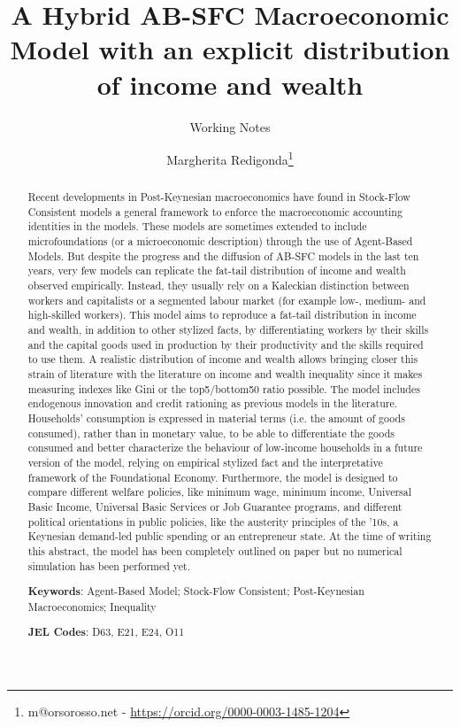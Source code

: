 \documentclass[a4paper, headings=standardclasses]{scrartcl}
\title{A Hybrid AB-SFC Macroeconomic Model with an explicit distribution of income and wealth \let\thefootnote\relax\footnotetext{
	This version is intended to be submitted as a working paper to the 2023 STOREP Conference.

	An updated version of this paper and all the source code and the instructions required to replicate the paper will be available at \url{https://github.com/TnTo/FE/}
  }}
\subtitle{Working Notes}
\author{Margherita Redigonda\thanks{m@orsorosso.net - \url{https://orcid.org/0000-0003-1485-1204}}}
\begin{document}
\maketitle

\begin{abstract}
    Recent developments in Post-Keynesian macroeconomics have found in Stock-Flow Consistent models a general framework to enforce the macroeconomic accounting identities in the models.
    These models are sometimes extended to include microfoundations (or a microeconomic description) through the use of Agent-Based Models.
    But despite the progress and the diffusion of AB-SFC models in the last ten years, very few models can replicate the fat-tail distribution of income and wealth observed empirically.
    Instead, they usually rely on a Kaleckian distinction between workers and capitalists or a segmented labour market (for example low-, medium- and high-skilled workers).
    This model aims to reproduce a fat-tail distribution in income and wealth, in addition to other stylized facts, by differentiating workers by their skills and the capital goods used in production by their productivity and the skills required to use them.
    A realistic distribution of income and wealth allows bringing closer this strain of literature with the literature on income and wealth inequality since it makes measuring indexes like Gini or the top5/bottom50 ratio possible.
    The model includes endogenous innovation and credit rationing as previous models in the literature.
    Households' consumption is expressed in material terms (i.e. the amount of goods consumed), rather than in monetary value, to be able to differentiate the goods consumed and better characterize the behaviour of low-income households in a future version of the model, relying on empirical stylized fact and the interpretative framework of the Foundational Economy.
    Furthermore, the model is designed to compare different welfare policies, like minimum wage, minimum income, Universal Basic Income, Universal Basic Services or Job Guarantee programs, and different political orientations in public policies, like the austerity principles of the '10s, a Keynesian demand-led public spending or an entrepreneur state.
    At the time of writing this abstract, the model has been completely outlined on paper but no numerical simulation has been performed yet.

    \textbf{Keywords}: Agent-Based Model; Stock-Flow Consistent; Post-Keynesian Macroeconomics; Inequality

    \textbf{JEL Codes}: D63, E21, E24, O11
\end{abstract}
\end{document}
